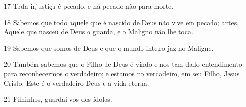 \par 17 Toda injustiça é pecado, e há pecado não para morte.
\par 18 Sabemos que todo aquele que é nascido de Deus não vive em pecado; antes, Aquele que nasceu de Deus o guarda, e o Maligno não lhe toca.
\par 19 Sabemos que somos de Deus e que o mundo inteiro jaz no Maligno.
\par 20 Também sabemos que o Filho de Deus é vindo e nos tem dado entendimento para reconhecermos o verdadeiro; e estamos no verdadeiro, em seu Filho, Jesus Cristo. Este é o verdadeiro Deus e a vida eterna.
\par 21 Filhinhos, guardai-vos dos ídolos.


